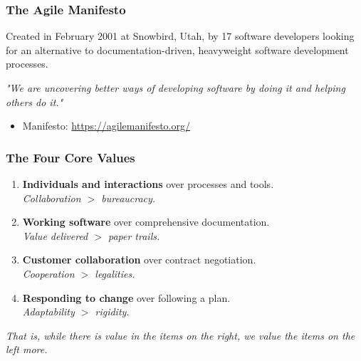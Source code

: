 \documentclass[xcolor=table]{beamer}
\begin{document}
\begin{frame}
    \frametitle{The Agile Manifesto}
    Created in February 2001 at Snowbird, Utah, by 17 software developers looking for an alternative to documentation-driven, heavyweight software development processes.
    
    \vspace{0.5cm}
    \begin{center}
        \textit{"We are uncovering better ways of developing software by doing it and helping others do it."}
    \end{center}

    \vspace{1cm}
    \begin{itemize}
        \item Manifesto: \url{https://agilemanifesto.org/}
    \end{itemize}
    
\end{frame}

\begin{frame}
    \frametitle{The Four Core Values}
    \begin{enumerate}
        \item \textbf{Individuals and interactions} over processes and tools. \\ \textit{Collaboration $>$ bureaucracy.}
        \item \textbf{Working software} over comprehensive documentation. \\ \textit{Value delivered $>$ paper trails.}
        \item \textbf{Customer collaboration} over contract negotiation.\\ \textit{Cooperation $>$ legalities.}
        \item \textbf{Responding to change} over following a plan. \\ \textit{Adaptability $>$ rigidity.}
    \end{enumerate}
    \vspace{0.3cm}
    \small \textit{That is, while there is value in the items on the right, we value the items on the left more.}
\end{frame}
\end{document}
